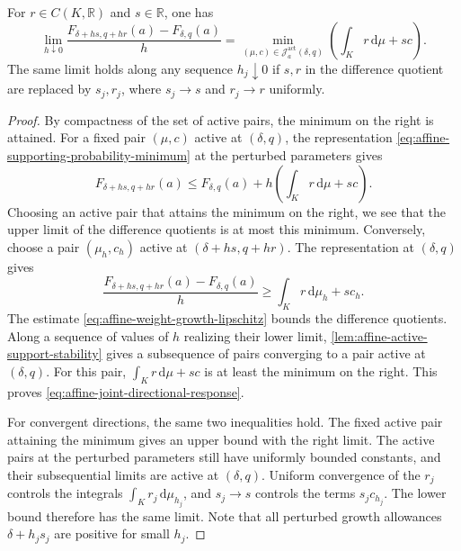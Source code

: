 \begin{proposition}\label{prop:affine-joint-directional-response}
For $r\in C(K,\mathbb R)$ and $s\in\mathbb R$, one has
\begin{equation}\label{eq:affine-joint-directional-response}
 \lim_{h\downarrow0}
 \frac{F_{\delta+hs,q+hr}(a)-F_{\delta,q}(a)}h
 =\min_{(\mu,c)\in\mathcal J^{\mathrm{act}}_a(\delta,q)}
       \left(\int_Kr\,\mathrm{d}\mu+sc\right).
\end{equation}
The same limit holds along any sequence $h_j\downarrow0$ if $s,r$ in the difference quotient are replaced by $s_j,r_j$, where $s_j\to s$ and $r_j\to r$ uniformly.
\end{proposition}
\begin{proof}
By compactness of the set of active pairs, the minimum on the right is attained. For a fixed pair $(\mu,c)$ active at $(\delta,q)$, the representation \eqref{eq:affine-supporting-probability-minimum} at the perturbed parameters gives
\[
 F_{\delta+hs,q+hr}(a)
 \leq F_{\delta,q}(a)+h\left(\int_Kr\,\mathrm{d}\mu+sc\right).
\]
Choosing an active pair that attains the minimum on the right, we see that the upper limit of the difference quotients is at most this minimum. Conversely, choose a pair $(\mu_h,c_h)$ active at $(\delta+hs,q+hr)$. The representation at $(\delta,q)$ gives
\[
 \frac{F_{\delta+hs,q+hr}(a)-F_{\delta,q}(a)}h
 \geq\int_Kr\,\mathrm{d}\mu_h+sc_h.
\]
The estimate \eqref{eq:affine-weight-growth-lipschitz} bounds the difference quotients. Along a sequence of values of $h$ realizing their lower limit, \cref{lem:affine-active-support-stability} gives a subsequence of pairs converging to a pair active at $(\delta,q)$. For this pair, $\int_Kr\,\mathrm{d}\mu+sc$ is at least the minimum on the right. This proves \eqref{eq:affine-joint-directional-response}.

For convergent directions, the same two inequalities hold. The fixed active pair attaining the minimum gives an upper bound with the right limit. The active pairs at the perturbed parameters still have uniformly bounded constants, and their subsequential limits are active at $(\delta,q)$. Uniform convergence of the $r_j$ controls the integrals $\int_Kr_j\,\mathrm{d}\mu_{h_j}$, and $s_j\to s$ controls the terms $s_jc_{h_j}$. The lower bound therefore has the same limit. Note that all perturbed growth allowances $\delta+h_js_j$ are positive for small $h_j$.
\end{proof}

